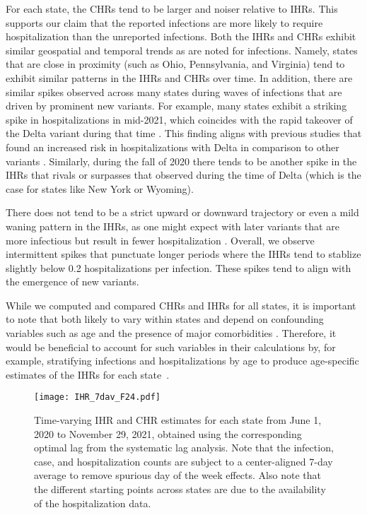 For each state, the CHRs tend to be larger and noiser relative to
IHRs. This supports our claim that the reported infections are more
likely to require hospitalization than the unreported infections. Both the IHRs
and CHRs exhibit similar geospatial and temporal trends as are noted for
infections. Namely, states that are close in proximity (such as Ohio,
Pennsylvania, and Virginia) tend to exhibit similar patterns in the IHRs and
CHRs over time. In addition, there are similar spikes observed across many
states during waves of infections that are driven by prominent new variants. For
example, many states exhibit a striking spike in hospitalizations in mid-2021,
which coincides with the rapid takeover of the Delta variant during that time
\citep{hodcroft2021covariants}. This finding aligns with previous studies that
found an increased risk in hospitalizations with Delta in comparison to other
variants \citep{twohig2022hospital, nyberg2022comparative}. Similarly, during
the fall of 2020 there tends to be another spike in the IHRs that rivals or
surpasses that observed during the time of Delta (which is the case for states
like New York or Wyoming). 

There does not tend to be a strict upward or downward trajectory or even a
mild waning pattern in the IHRs, as one might expect with later variants that are
more infectious but result in fewer hospitalization
\citep{lorenzo2022covid, blauer2022compare}. Overall, we observe intermittent
spikes that punctuate longer periods where the IHRs tend to stablize slightly below 0.2
hospitalizations per infection. These spikes tend to align with the emergence of
new variants. 

While we computed and compared CHRs and IHRs for all states, it is important to
note that both likely to vary within states and depend on confounding variables
such as age and the presence of major comorbidities
\citep{russell2023comorbidities}. Therefore, it would be beneficial to account
for such variables in their calculations by, for example, stratifying infections
and hospitalizations by age to produce age-specific estimates of the IHRs for
each state~\citep{fox2023disproportionate}.



\begin{figure}[!tb]
\centering
\texttt{[image: IHR\_7dav\_F24.pdf]}
\caption{Time-varying IHR and CHR estimates for each state from June 1, 2020
to November 29, 2021, obtained using the corresponding optimal lag from the
systematic lag analysis. Note that the infection, case, and hospitalization
counts are subject to a center-aligned 7-day average to remove spurious day
of the week effects. Also note that the different starting points across
states are due to the availability of the hospitalization data.}
\label{fig:IHR_7dav}
\end{figure}



